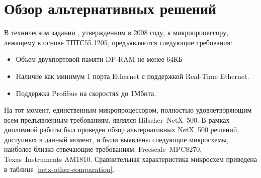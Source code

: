 \documentclass[a4paper,14pt,bachelor]{disser}
\begin{document}
\section{Обзор альтернативных решений}
В техническом задании \cite{TZ}, утвержденном в 2008 году, к микропроцессору, лежащему в основе ТПТС55.1205, предъявляются следующие требования:
\begin{itemize}
 \item Объем двухпортовой памяти DP-RAM не менее 64КБ
 \item Наличие как минимум 1 порта Ethernet с поддержкой Real-Time Ethernet.
 \item Поддержка Profibus на скоростях до 1Мбита.
\end{itemize}

На тот момент, единственным микропроцессором, полностью удовлетворяющим всем предъявленным требованиям, являлся Hilscher~NetX~500. В рамках дипломной работы был проведен обзор альтернативных NetX~500 решений, доступных в данный момент, и были выявлены следующие микросхемы, наиболее близко отвечающие требованиям: Freescale~MPC8270\cite{Sheg}, Texas~Instruments AM1810. Сравнительная характеристика микросхем приведена в таблице \ref{netx-other-comparation}.
\end{document}
